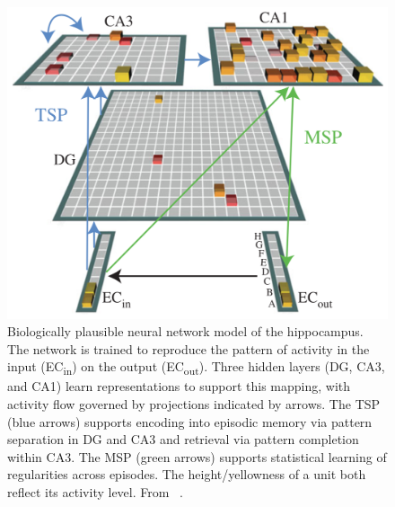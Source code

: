 \setlength{\columnsep}{20pt}
\begin{figure}
\centering
\includegraphics[width=.44\textwidth]{figs/hipp-model}
\caption{\small Biologically plausible neural network model of the
hippocampus. The network is trained to reproduce the pattern of
activity in the input (EC\textsubscript{in}) on the output
(EC\textsubscript{out}). Three hidden layers (DG, CA3, and CA1) learn
representations to support this mapping, with activity flow governed
by projections indicated by arrows. The TSP (blue
arrows) supports encoding into episodic memory via pattern separation
in DG and CA3 and retrieval via pattern completion within CA3. The
MSP (green arrows) supports statistical learning of
regularities across episodes. The height/yellowness of a unit both
reflect its activity level. From ~\citet{Schapiro:2017}.}
    \label{fig:hipp}
    \vskip-10pt
\end{figure}

